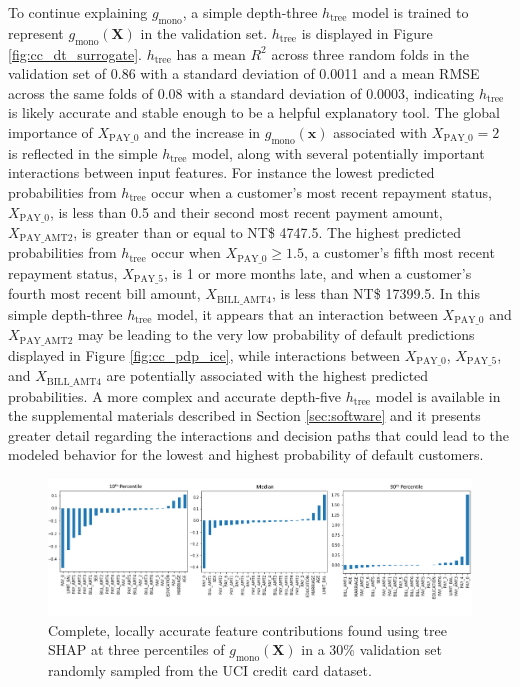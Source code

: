 \documentclass[sigconf]{acmart}
\begin{document}
To continue explaining $g_{\text{mono}}$, a simple depth-three $h_{\text{tree}}$ model is trained to represent  $g_{\text{mono}}(\mathbf{X})$ in the validation set. $h_{\text{tree}}$ is displayed in Figure \ref{fig:cc_dt_surrogate}. $h_{\text{tree}}$ has a mean $R^2$ across three random folds in the validation set of 0.86 with a standard deviation of 0.0011 and a mean RMSE across the same folds of 0.08 with a standard deviation of 0.0003, indicating $h_{\text{tree}}$ is likely accurate and stable enough to be a helpful explanatory tool. The global importance of $X_{\text{PAY\_0}}$  and the increase in $g_{\text{mono}}(\mathbf{x})$ associated with $X_{\text{PAY\_0}} = 2$ is reflected in the simple $h_{\text{tree}}$ model, along with several potentially important interactions between input features. For instance the lowest predicted probabilities from $h_{\text{tree}}$ occur when a customer's  most recent repayment status, $X_{\text{PAY\_0}}$, is less than 0.5 and their second most recent payment amount, $X_{\text{PAY\_AMT2}}$, is greater than or equal to NT\$ 4747.5. The highest predicted probabilities from $h_{\text{tree}}$ occur when $X_{\text{PAY\_0}} \geq 1.5$, a customer's fifth most recent repayment status, $X_{\text{PAY\_5}}$, is 1 or more months late, and when a customer's fourth most recent bill amount, $X_{\text{BILL\_AMT4}}$, is less than NT\$ 17399.5. In this simple depth-three $h_{\text{tree}}$ model, it appears that an interaction between $X_{\text{PAY\_0}}$ and $X_{\text{PAY\_AMT2}}$ may be leading to the very low probability of default predictions displayed in Figure \ref{fig:cc_pdp_ice}, while interactions between $X_{\text{PAY\_0}}$, $X_{\text{PAY\_5}}$, and $X_{\text{BILL\_AMT4}}$ are potentially associated with the highest predicted probabilities. A more complex and accurate depth-five $h_{\text{tree}}$ model is available in the supplemental materials described in Section \ref{sec:software} and it presents greater detail regarding the interactions and decision paths that could lead to the modeled behavior for the lowest and highest probability of default customers. 
 
\begin{figure}[htb]
	\begin{center}
		\includegraphics[scale=0.55]{img/figure_10_h_lo.png}
		\caption{Complete, locally accurate feature contributions found using tree SHAP at three percentiles of $g_{\text{mono}}(\mathbf{X})$ in a 30\% validation set randomly sampled from the UCI credit card dataset.}
		\label{fig:cc_shap}
	\end{center}
\end{figure}
\end{document}
